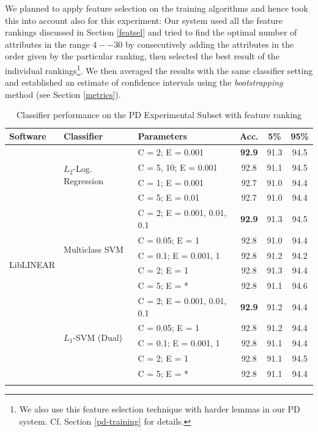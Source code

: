 \documentclass[12pt,notitlepage]{report}
\begin{document}
We planned to apply feature selection on the training algorithms and hence took this into account also for this experiment: Our system used all the feature rankings discussed in Section \ref{featsel} and tried to find the optimal number of attributes in the range $4--30$ by consecutively adding the attributes in the order given by the particular ranking, then selected the best result of the individual rankings\footnote{We also use this feature selection technique with harder lemmas in our PD system. Cf. Section \ref{pd-training} for details.}. We then averaged the results with the same classifier setting and established an estimate of confidence intervals using the \emph{bootstrapping} method (see Section \ref{metrics}).

\begin{table}[htbp]
\caption{Classifier performance on the PD Experimental Subset with feature ranking}\label{tab:pd-classifiers}\footnotesize
\begin{center}
\begin{tabular}{|l|l|l|c|c|c|}\hline
\bf Software & \bf Classifier & \bf Parameters & \bf Acc. & \bf 5\% & \bf 95\% \\\hline
\multirow{24}{*}{LibLINEAR} & \multirow{4}{*}{$L_2$-Log. Regression} & C = 2; E = 0.001 & \bf 92.9 & 91.3 & 94.5 \\
 & & C = 5, 10; E = 0.001 & 92.8 & 91.1 & 94.5 \\
 & & C = 1; E = 0.001 & 92.7 & 91.0 & 94.4 \\
 & & C = 5; E = 0.01 & 92.7 & 91.0 & 94.4 \\\cline{2-6}
 & \multirow{5}{*}{Multiclass SVM} & C = 2; E = 0.001, 0.01, 0.1 & \bf 92.9 & 91.3 & 94.5 \\ 
 &  & C = 0.05; E = 1 & 92.8 & 91.0 & 94.4 \\
 &  & C = 0.1; E = 0.001, 1 & 92.8 & 91.2 & 94.2 \\
 &  & C = 2; E = 1 & 92.8 & 91.3 & 94.4 \\
 & & C = 5; E = * & 92.8 & 91.1 & 94.6 \\\cline{2-6}
 & \multirow{5}{*}{$L_1$-SVM (Dual)} & C = 2; E = 0.001, 0.01, 0.1 & \bf 92.9 & 91.2 & 94.4 \\
 & & C = 0.05; E = 1 & 92.8 & 91.2 & 94.4 \\
 &  & C = 0.1; E = 0.001, 1 & 92.8 & 91.1 & 94.4 \\
 & & C = 2; E = 1 & 92.8 & 91.1 & 94.5 \\
 & & C = 5; E = * & 92.8 & 91.1 & 94.4 \\\cline{2-6}

\end{tabular}
\end{center}
\end{table}
\end{document}
